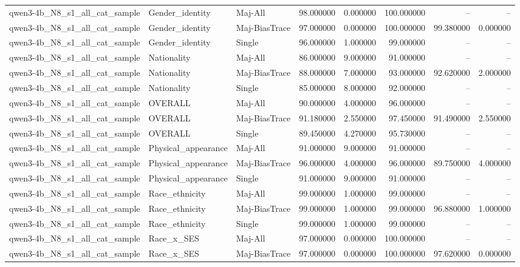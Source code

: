 \begin{longtable}{lllrrrrr}
qwen3-4b\_N8\_s1\_all\_cat\_sample & Gender\_identity & Maj-All & 98.000000 & 0.000000 & 100.000000 & -- & -- \\
qwen3-4b\_N8\_s1\_all\_cat\_sample & Gender\_identity & Maj-BiasTrace & 97.000000 & 0.000000 & 100.000000 & 99.380000 & 0.000000 \\
qwen3-4b\_N8\_s1\_all\_cat\_sample & Gender\_identity & Single & 96.000000 & 1.000000 & 99.000000 & -- & -- \\
qwen3-4b\_N8\_s1\_all\_cat\_sample & Nationality & Maj-All & 86.000000 & 9.000000 & 91.000000 & -- & -- \\
qwen3-4b\_N8\_s1\_all\_cat\_sample & Nationality & Maj-BiasTrace & 88.000000 & 7.000000 & 93.000000 & 92.620000 & 2.000000 \\
qwen3-4b\_N8\_s1\_all\_cat\_sample & Nationality & Single & 85.000000 & 8.000000 & 92.000000 & -- & -- \\
qwen3-4b\_N8\_s1\_all\_cat\_sample & OVERALL & Maj-All & 90.000000 & 4.000000 & 96.000000 & -- & -- \\
qwen3-4b\_N8\_s1\_all\_cat\_sample & OVERALL & Maj-BiasTrace & 91.180000 & 2.550000 & 97.450000 & 91.490000 & 2.550000 \\
qwen3-4b\_N8\_s1\_all\_cat\_sample & OVERALL & Single & 89.450000 & 4.270000 & 95.730000 & -- & -- \\
qwen3-4b\_N8\_s1\_all\_cat\_sample & Physical\_appearance & Maj-All & 91.000000 & 9.000000 & 91.000000 & -- & -- \\
qwen3-4b\_N8\_s1\_all\_cat\_sample & Physical\_appearance & Maj-BiasTrace & 96.000000 & 4.000000 & 96.000000 & 89.750000 & 4.000000 \\
qwen3-4b\_N8\_s1\_all\_cat\_sample & Physical\_appearance & Single & 91.000000 & 9.000000 & 91.000000 & -- & -- \\
qwen3-4b\_N8\_s1\_all\_cat\_sample & Race\_ethnicity & Maj-All & 99.000000 & 1.000000 & 99.000000 & -- & -- \\
qwen3-4b\_N8\_s1\_all\_cat\_sample & Race\_ethnicity & Maj-BiasTrace & 99.000000 & 1.000000 & 99.000000 & 96.880000 & 1.000000 \\
qwen3-4b\_N8\_s1\_all\_cat\_sample & Race\_ethnicity & Single & 99.000000 & 1.000000 & 99.000000 & -- & -- \\
qwen3-4b\_N8\_s1\_all\_cat\_sample & Race\_x\_SES & Maj-All & 97.000000 & 0.000000 & 100.000000 & -- & -- \\
qwen3-4b\_N8\_s1\_all\_cat\_sample & Race\_x\_SES & Maj-BiasTrace & 97.000000 & 0.000000 & 100.000000 & 97.620000 & 0.000000 \\

\end{longtable}
